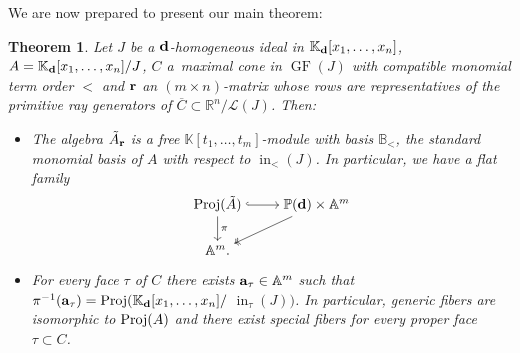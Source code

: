 \documentclass[pdftex]{sigma}%
\newtheorem{Theorem}{Theorem}[section]
\numberwithin{equation}{section}
\DeclareMathOperator{\init}{in}
\DeclareMathOperator{\GF}{GF}
\begin{document}
We are now prepared to present our main theorem:

\begin{Theorem}
Let $J$ be a ${\bf d}$-homogeneous ideal in $\mathbb K_{\bf d}[x_1,\dots,x_n]$, $A=\mathbb K_{\bf d}[x_1,\ldots,x_n]/J$, $C$ a~maximal cone in $\GF(J)$ with compatible monomial term order $<$ and ${\bf r}$ an $(m\times n)$-matrix whose rows are representatives of the primitive ray generators of $\overline{C}\subset \mathbb R^n/\mathcal L(J)$. Then:
\begin{itemize}\itemsep=0pt
 \item[$(i)$] The algebra $\tilde A_{\bf r}$ is a free $\mathbb K[t_1,\dots,t_m]$-module with basis $\mathbb B_<$, the standard monomial basis of $A$ with respect to $\init_<(J)$.
 In particular, we have a flat family
 \begin{displaymath}
 \begin{tikzcd}[ampersand replacement=\&,cramped]
 {\rm Proj}(\tilde A) \ar[r,hook]\ar[d,"\pi"] \& \mathbb P({\bf d})\times \mathbb A^m \ar[ld,twoheadrightarrow]\\
 \mathbb A^m. \&
 \end{tikzcd}
 \end{displaymath}
\item[$(ii)$] For every face $\tau$ of $C$ there exists ${\bf a}_\tau\in \mathbb A^m$ such that
 $\pi^{-1}({\bf a}_\tau) = {\rm Proj}(\mathbb K_{\bf d}[x_1,\dots,x_n]/$ $\init_\tau(J))$.
 In particular, generic fibers are isomorphic to ${\rm Proj}(A)$ and there exist special fibers for every proper face $\tau\subset C$.
\end{itemize}
\end{Theorem}
\end{document}
